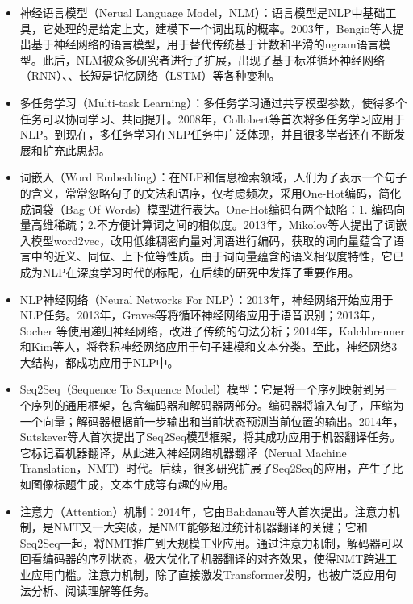 \begin{enumerate}
\begin{itemize}
    \item 神经语言模型（Nerual Language Model，NLM）：语言模型是NLP中基础工具，它处理的是给定上文，建模下一个词出现的概率。2003年，Bengio等人提出基于神经网络的语言模型\cite{bengio2003neural}，用于替代传统基于计数和平滑的ngram语言模型。此后，NLM被众多研究者进行了扩展，出现了基于标准循环神经网络（RNN）、\cite{mikolov2010recurrent}、长短是记忆网络（LSTM）\cite{graves2013generating}等各种变种。
    \item 多任务学习（Multi-task Learning）：多任务学习通过共享模型参数，使得多个任务可以协同学习、共同提升。2008年，Collobert等首次将多任务学习\cite{collobert2008unified}应用于NLP。到现在，多任务学习在NLP任务中广泛体现，并且很多学者还在不断发展和扩充此思想。
    \item 词嵌入（Word Embedding）：在NLP和信息检索领域，人们为了表示一个句子的含义，常常忽略句子的文法和语序，仅考虑频次，采用One-Hot编码，简化成词袋（Bag Of Words）模型进行表达。One-Hot编码有两个缺陷：1. 编码向量高维稀疏；2.不方便计算词之间的相似度。2013年，Mikolov等人提出了词嵌入模型word2vec\cite{mikolov2013efficient}，改用低维稠密向量对词语进行编码，获取的词向量蕴含了语言中的近义、同位、上下位等性质。由于词向量蕴含的语义相似度特性，它已成为NLP在深度学习时代的标配，在后续的研究中发挥了重要作用。
    \item NLP神经网络（Neural Networks For NLP）：2013年，神经网络开始应用于NLP任务。2013年，Graves等将循环神经网络\cite{graves2013hybrid}应用于语音识别；2013年，Socher 等使用递归神经网络\cite{socher2013recursive}，改进了传统的句法分析；2014年，Kalchbrenner 和Kim等人，将卷积神经网络\cite{kalchbrenner2014convolutional}\cite{kim2014convolutional}应用于句子建模和文本分类。至此，神经网络3大结构，都成功应用于NLP中。
    \item Seq2Seq（Sequence To Sequence Model）模型：它是将一个序列映射到另一个序列的通用框架，包含编码器和解码器两部分。编码器将输入句子，压缩为一个向量；解码器根据前一步输出和当前状态预测当前位置的输出。2014年，Sutskever等人首次提出了Seq2Seq\cite{sutskever2014sequence}模型框架，将其成功应用于机器翻译任务。它标记着机器翻译，从此进入神经网络机器翻译（Nerual Machine Translation，NMT）时代。后续，很多研究扩展了Seq2Seq的应用，产生了比如图像标题生成，文本生成等有趣的应用。
    \item 注意力（Attention）机制：2014年，它由Bahdanau\cite{bahdanau2014neural}等人首次提出。注意力机制，是NMT又一大突破，是NMT能够超过统计机器翻译的关键；它和Seq2Seq一起，将NMT推广到大规模工业应用。通过注意力机制，解码器可以回看编码器的序列状态，极大优化了机器翻译的对齐效果，使得NMT跨进工业应用门槛。注意力机制，除了直接激发Transformer\cite{vaswani2017attention}发明，也被广泛应用句法分析\cite{vinyals2015grammar}、阅读理解\cite{hermann2015teaching}等任务。

\end{itemize}
\end{enumerate}
